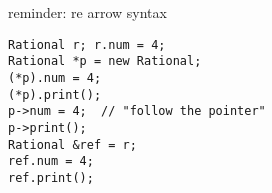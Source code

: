\begin{frame}[fragile,label=arrowSyn]{reminder: re arrow syntax}
\lstset{
    language=C,
    style=small
}
\begin{lstlisting}
Rational r; r.num = 4;
Rational *p = new Rational;
(*p).num = 4;
(*p).print();
p->num = 4;  // "follow the pointer"
p->print();
Rational &ref = r;
ref.num = 4;
ref.print();
\end{lstlisting}
\end{frame}
